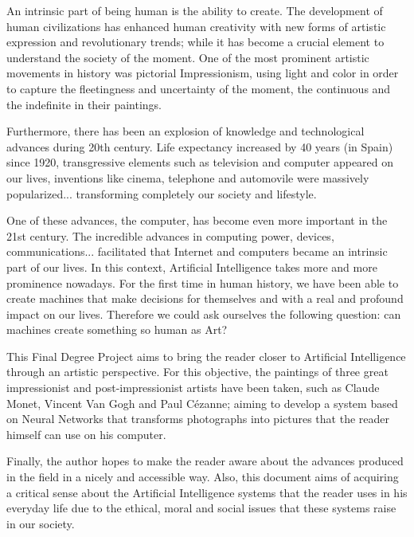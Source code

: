 \documentclass[a4paper]{report}
\begin{document}
An intrinsic part of being human is the ability to create. The development of human civilizations has enhanced human creativity with new forms of artistic expression and revolutionary trends; while it has become a crucial element to understand the society of the moment. One of the most prominent artistic movements in history was pictorial Impressionism, using light and color in order to capture the fleetingness and uncertainty of the moment, the continuous and the indefinite in their paintings. \newline

Furthermore, there has been an explosion of knowledge and technological advances during 20th century. Life expectancy increased by 40 years (in Spain) since 1920, transgressive elements such as television and computer appeared on our lives, inventions like cinema, telephone and automovile were massively popularized... transforming completely our society and lifestyle. \newline

One of these advances, the computer, has become even more important in the 21st century. The incredible advances in computing power, devices, communications... facilitated that Internet and computers became an intrinsic part of our lives. In this context, Artificial Intelligence takes more and more prominence nowadays. For the first time in human history, we have been able to create machines that make decisions for themselves and with a real and profound impact on our lives. Therefore we could ask ourselves the following question: can machines create something so human as Art? \newline

This Final Degree Project aims to bring the reader closer to Artificial Intelligence through an artistic perspective. For this objective, the paintings of three great impressionist and post-impressionist artists have been taken, such as Claude Monet, Vincent Van Gogh and Paul Cézanne; aiming to develop a system based on Neural Networks that transforms photographs into pictures that the reader himself can use on his computer. \newline

Finally, the author hopes to make the reader aware about the advances produced in the field in a nicely and accessible way. Also, this document aims of acquiring a critical sense about the Artificial Intelligence systems that the reader uses in his everyday life due to the ethical, moral and social issues that these systems raise in our society. \newline
\end{document}
